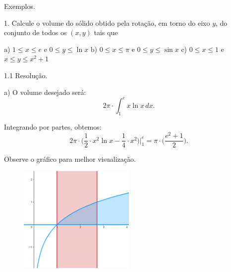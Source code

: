 \documentclass{article}
\begin{document}
{\begin{newpage}
\par
\vspace{0.3cm}
Exemplos.
\par
\begin{flushleft}
1. Calcule o volume do sólido obtido pela rotação, em torno do eixo $y$, do conjunto de todos os $(x,y)$ tais que
\end{flushleft}
\par a) $\displaystyle{1\leq x\leq e}$ e $\displaystyle{0\leq y\leq\ln{x}}$
\hspace{0.3cm}
b) $\displaystyle{0\leq x\leq\pi}$ e $\displaystyle{0\leq y\leq\sin{x}}$
\hspace{0.3cm}
c) $\displaystyle{0\leq x\leq 1}$ e $\displaystyle{x\leq y\leq x^{2} + 1}$
\par
\vspace{0.3cm}
\begin{flushleft}
1.1 Resolução.
\end{flushleft}
\par a) O volume desejado será:
\begin{equation*}\displaystyle{2\pi\cdot\int_{1}^{e} x\ln{x}\, dx}.\end{equation*}
\par Integrando por partes, obtemos:
\begin{equation*}\displaystyle{2\pi\cdot\Big( \frac{1}{2}\cdot x^{2}\ln{}x - \frac{1}{4}\cdot x^{2}\Big)\Big|^{e}_{1} = \pi\cdot\Big(\frac{e^{2}+1}{2}\Big)} .\end{equation*}
\par Observe o gráfico para melhor visualização.
\begin{figure}[htbp]
\begin{center}
\includegraphics[width=0.5\textwidth, angle=0]{Grafico21.png}
\end{center}  
\end{figure}
\par
\vspace{0.3cm}

\end{newpage}}
\end{document}
